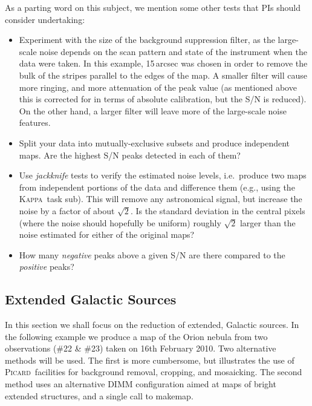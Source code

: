 \documentclass[twoside,11pt]{article}
\newcommand{\xref}[3]{#1}
\newcommand{\xlabel}[1]{}
\renewcommand{\_}{\texttt{\symbol{95}}}
\newcommand{\Kappa}{\xref{\textsc{Kappa}}{sun95}{}}
\newcommand{\picard}{\xref{\textsc{Picard}}{sun231}{}}
\newcommand{\task}[1]{\textsf{#1}}
\newcommand{\makemap}{\xref{\task{makemap}}{sun258}{MAKEMAP}}
\newcommand{\sub}{\xref{\task{sub}}{sun95}{SUB}}
\begin{document}
As a parting word on this subject, we mention some other tests that
PIs should consider undertaking:

\begin{itemize}

\item Experiment with the size of the background suppression filter,
  as the large-scale noise depends on the scan pattern and state of
  the instrument when the data were taken. In this example, 15\,arcsec
  was chosen in order to remove the bulk of the stripes parallel to
  the edges of the map. A smaller filter will cause more ringing, and
  more attenuation of the peak value (as mentioned above this is
  corrected for in terms of absolute calibration, but the S/N is
  reduced). On the other hand, a larger filter will leave more of the
  large-scale noise features.

\item Split your data into mutually-exclusive subsets and produce
  independent maps. Are the highest S/N peaks detected in each of
  them?

\item Use {\em jackknife} tests to verify the estimated noise levels,
  i.e.~produce two maps from independent portions of the data and
  difference them (e.g., using the \Kappa\ task \sub). This will
  remove any astronomical signal, but increase the noise by a factor
  of about $\sqrt{2}$. Is the standard deviation in the central pixels
  (where the noise should hopefully be uniform) roughly $\sqrt{2}$
  larger than the noise estimated for either of the original maps?

\item How many {\em negative} peaks above a given S/N are there
  compared to the {\em positive} peaks?

\end{itemize}

\subsection{\xlabel{Galactic}Extended Galactic Sources}
\label{sec:galactic}
In this section we shall focus on the reduction of extended, Galactic
sources. In the following example we produce a map of the Orion nebula
from two observations (\#22 \& \#23) taken on 16th February 2010. Two
alternative methods will be used. The first is more cumbersome, but
illustrates the use of \picard\ facilities for background removal,
cropping, and mosaicking. The second method uses an alternative DIMM
configuration aimed at maps of bright extended structures, and a
single call to \makemap.
\end{document}
